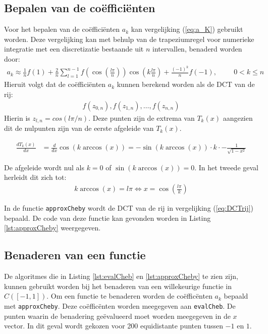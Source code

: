 \documentclass[a4paper, 12pt, titlepage, fleqn]{article}
\begin{document}
\subsection{Bepalen van de co\"effici\"enten}
Voor het bepalen van de co\"effici\"enten $a_k$ kan vergelijking (\ref{eq:a_K}) gebruikt worden. Deze vergelijking kan met behulp van de trapeziumregel voor numerieke integratie met een discretizatie bestaande uit $n$ intervallen, benaderd worden door:
\begin{align*}
a_k \approx \frac{1}{n}f(1) + \frac{2}{n}\sum_{l=1}^{n-1}f\left(\cos\left(\frac{l\pi}{n}\right)\right)\cos\left(k\frac{l\pi}{n}\right) + \frac{(-1)^k}{n}f(-1), \hspace{1cm} 0 < k \leq n
\end{align*}
Hieruit volgt dat de co\"effici\"enten $a_k$ kunnen berekend worden als de DCT van de rij:
\begin{align}
f(z_{0,n}),f(z_{1,n}), \ldots, f(z_{n,n})
\label{eq:DCTrij}
\end{align} 
Hierin is $z_{l,n} = cos(l\pi/n)$. Deze punten zijn de extrema van $T_k(x)$ aangezien dit de nulpunten zijn van de eerste afgeleide van $T_k(x)$.

\begin{align*}
\frac{dT_k(x)}{dx} &= \frac{d}{dx}\cos(k\arccos(x)) = -\sin(k \arccos(x))\cdot k \cdot - \frac{1}{\sqrt{1-x^2}}
\end{align*}

De afgeleide wordt nul als $k=0$ of $\sin(k \arccos(x)) = 0$. In het tweede geval herleidt dit zich tot:
\begin{align*}
k\arccos(x) = l\pi \Leftrightarrow x = \cos\left(\frac{l\pi}{k}\right)
\end{align*}

In de functie \texttt{approxCheby} wordt de DCT van de rij in vergelijking (\ref{eq:DCTrij}) bepaald. De code van deze functie kan gevonden worden in Listing \ref{lst:approxCheby} weergegeven.




\subsection{Benaderen van een functie}
De algoritmes die in Listing \ref{lst:evalCheb} en \ref{lst:approxCheby} te zien zijn, kunnen gebruikt worden bij het benaderen van een willekeurige functie in $C([-1,1])$. Om een functie te benaderen worden de co\"effic\"enten $a_k$ bepaald met \texttt{approxCheby}. Deze co\"effic\"enten worden meegegeven aan \texttt{evalCheb}. De punten waarin de benadering ge\"evalueerd moet worden meegegeven in de $x$ vector. In dit geval wordt gekozen voor 200 equidistante punten tussen $-1$ en $1$.
\end{document}
